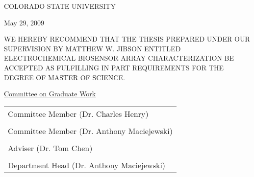 \begin{center}
	COLORADO STATE UNIVERSITY
\end{center}

\vspace{0.5in}

\begin{flushright}
	May 29, 2009
\end{flushright}

WE HEREBY RECOMMEND THAT THE THESIS PREPARED UNDER OUR SUPERVISION BY MATTHEW W. JIBSON ENTITLED ELECTROCHEMICAL BIOSENSOR ARRAY CHARACTERIZATION BE ACCEPTED AS FULFILLING IN PART REQUIREMENTS FOR THE DEGREE OF MASTER OF SCIENCE.

\vspace{0.5in}

\begin{center}
	\underline{Committee on Graduate Work}\\

	\vspace{0.5in}

	\begin{tabular}{p{3in}}
		\\
		\hline Committee Member (Dr. Charles Henry)\\
		\\
		\hline Committee Member (Dr. Anthony Maciejewski)\\
		\\
		\hline Adviser (Dr. Tom Chen)\\
		\\
		\hline Department Head (Dr. Anthony Maciejewski)
	\end{tabular}
\end{center}
